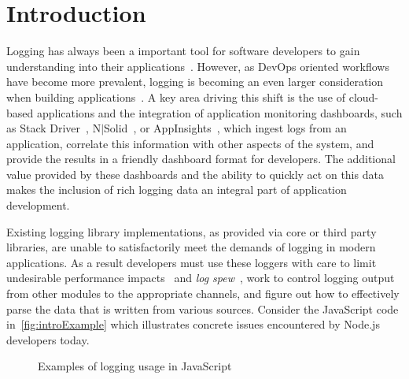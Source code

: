 \documentclass[sigplan,10pt,screen]{acmart}
\begin{document}


\maketitle

\section{Introduction} 
\label{sec:intro}
Logging has always been a important tool for software developers to 
gain understanding into their applications~\cite{logdebug,logdebug2,logstudy}. 
However, as DevOps oriented workflows have
become more prevalent, logging is becoming an even larger consideration when
building applications~\cite{logstudy,logstudy2}. A key area driving this shift is the use of cloud-based
applications and the integration of application monitoring dashboards, such as
Stack Driver~\cite{StackDriver}, N$|$Solid~\cite{NSolid}, or
AppInsights~\cite{AppInsights}, which ingest logs from an application, correlate
this information with other aspects of the system, and provide the results in a friendly
dashboard format for developers. The additional value provided by these
dashboards and the ability to quickly act on this data makes the inclusion of
rich logging data an integral part of application development.

Existing logging library implementations, as provided via core or third party
libraries, are unable to satisfactorily meet the demands of logging in modern
applications. As a result developers must use these loggers with care to
limit undesirable performance impacts~\cite{learnlog} and \emph{log spew}~\cite{learnlog,logstudy2}, work 
to control logging output from other modules to the appropriate channels, and figure
out how to effectively parse the data that is written from various sources.
Consider the JavaScript code in~\autoref{fig:introExample} 
which illustrates concrete issues encountered by Node.js~\cite{Node} developers today.

\begin{figure*}[t]

\caption{Examples of logging usage in JavaScript}
\label{fig:introExample}
\end{figure*}
\end{document}
